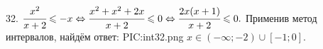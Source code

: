 32. $\cfrac{x^2}{x+2}\leqslant -x\Leftrightarrow\cfrac{x^2+x^2+2x}{x+2}\leqslant 0\Leftrightarrow\cfrac{2x(x+1)}{x+2}\leqslant 0.$
Применив метод интервалов, найдём ответ:
{{PIC:int32.png}}
$x\in(-\infty;-2)\cup[-1;0].$\\

